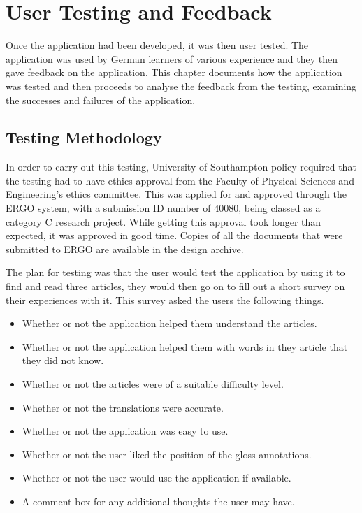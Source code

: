 \chapter{User Testing and Feedback}

Once the application had been developed, it was then user tested. The application was used by German learners of various experience and they then gave feedback on the application. This chapter documents how the application was tested and then proceeds to analyse the feedback from the testing, examining the successes and failures of the application.

\section{Testing Methodology}

In order to carry out this testing, University of Southampton policy required that the testing had to have ethics approval from the Faculty of Physical Sciences and Engineering's ethics committee. This was applied for and approved through the ERGO system, with a submission ID number of 40080, being classed as a category C research project. While getting this approval took longer than expected, it was approved in good time. Copies of all the documents that were submitted to ERGO are available in the design archive. 

The plan for testing was that the user would test the application by using it to find and read three articles, they would then go on to fill out a short survey on their experiences with it. This survey asked the users the following things. 
\begin{itemize}
	\item Whether or not the application helped them understand the articles.
	
	\item Whether or not the application helped them with words in they article that they did not know.
	
	\item Whether or not the articles were of a suitable difficulty level.
	
	\item Whether or not the translations were accurate.
	
	\item Whether or not the application was easy to use.
	
	\item Whether or not the user liked the position of the gloss annotations.
	
	\item Whether or not the user would use the application if available. 
	
	\item A comment box for any additional thoughts the user may have. 
\end{itemize}


